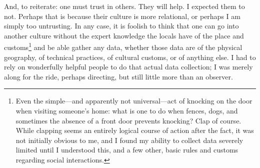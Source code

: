 And, to reiterate: one must trust in others. They will help. I expected them to not. Perhaps that is because their culture is more relational, or perhaps I am simply too untrusting. In any case, it is foolish to think that one can go into another culture without the expert knowledge the locals have of the place and customs\footnote{Even the simple---and apparently not universal---act of knocking on the door when visiting someone's home: what is one to do when fences, dogs, and sometimes the absence of a front door prevents knocking? Clap of course. While clapping seems an entirely logical course of action after the fact, it was not initially obvious to me, and I found my ability to collect data severely limited until I understood this, and a few other, basic rules and customs regarding social interactions.} and be able gather any data, whether those data are of the physical geography, of technical practices, of cultural customs, or of anything else. I had to rely on wonderfully helpful people to do that actual data collection; I was merely along for the ride, perhaps directing, but still little more than an observer. 